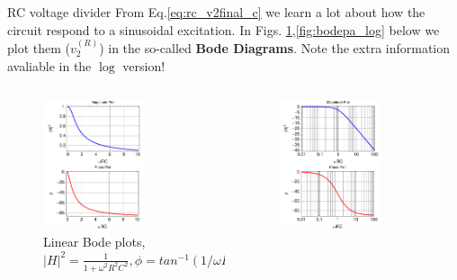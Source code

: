 \begin{frame}{RC voltage divider}
From Eq.\ref{eq:rc_v2final_c} we learn a lot about how the circuit respond to a sinusoidal excitation. In Figs. \ref{fig:bodepa_lin},\ref{fig:bodepa_log} below we plot them ($v_2^{(R)}$) in the so-called \textbf{Bode Diagrams}. Note the extra information avaliable in the $\log$ version!
	\begin{columns}
		\begin{column}{0.5\textwidth}
			\begin{figure}
  			\includegraphics[width=0.7\textwidth]{bodepb_lin.pdf}
  			\caption{Linear Bode plots, $|H|^2=\frac{1}{1+\omega^2 R^2 C^2},\phi=tan^{-1}(1/\omega RC)$}
  			\label{fig:bodepa_lin}
			\end{figure}
		\end{column}
		\begin{column}{0.5\textwidth}
			\begin{figure}
  			\includegraphics[width=0.7\textwidth]{bodepb_log.pdf}

\end{figure}
\end{column}
\end{columns}
\end{frame}
